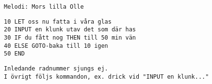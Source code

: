 {\small{\scriptsize\texttt{Melodi: Mors lilla Olle}}\par
\vspace{10pt}
\texttt{10 LET oss nu fatta i våra glas}\\
\texttt{20 INPUT en klunk utav det som där has}\\
\texttt{30 IF du fått nog THEN till 50 min vän}\\
\texttt{40 ELSE GOTO-baka till 10 igen}\\
\texttt{50 END}\par
\vspace{10pt}
{\scriptsize\texttt{Inledande radnummer sjungs ej.\\ I övrigt följs
    kommandon, ex. drick vid "INPUT en klunk..."}}}
